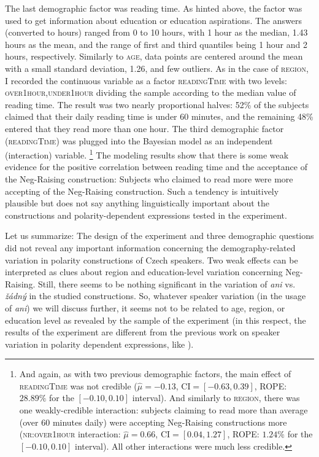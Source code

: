 \documentclass[output=paper,colorlinks,citecolor=brown]{langscibook}
\begin{document}
The last demographic factor was reading time. As hinted above, the factor was used to get information about education or education aspirations. The answers (converted to hours) ranged from 0 to 10 hours, with 1 hour as the median, 1.43 hours as the mean, and the range of first and third quantiles being 1 hour and 2 hours, respectively. Similarly to \textsc{age}, data points are centered around the mean with a small standard deviation, 1.26, and few outliers. As in the case of \textsc{region}, I recorded the continuous variable as a factor \textsc{readingTime} with two levels: \textsc{over1hour,under1hour} dividing the sample according to the median value of reading time. The result was two nearly proportional halves: 52\% of the subjects claimed that their daily reading time is under 60 minutes, and the remaining 48\% entered that they read more than one hour. The third demographic factor (\textsc{readingTime}) was plugged into the Bayesian model as an independent (interaction) variable.%
\footnote{And again, as with two previous demographic factors, the main effect of \textsc{readingTime} was not credible ($\hat{\mu}=-0.13$, $\mathrm{CI}=[-0.63,  0.39]$, ROPE: $28.89\%$ for the $[-0.10, 0.10]$ interval). And similarly to \textsc{region}, there was one weakly-credible interaction: subjects claiming to read more than average (over 60 minutes daily) were accepting Neg-Raising constructions more (\textsc{nr:over1hour} interaction: $\hat{\mu}=0.66$, $\mathrm{CI}=[ 0.04,  1.27]$, ROPE: $1.24\%$ for the $[-0.10, 0.10]$ interval). All other interactions were much less credible.}
The modeling results show that there is some weak evidence for the positive correlation between reading time and the acceptance of the Neg-Raising construction: Subjects who claimed to read more were more accepting of the Neg-Raising construction. Such a tendency is intuitively plausible but does not say anything linguistically important about the constructions and polarity-dependent expressions tested in the experiment.


Let us summarize: The design of the experiment and three demographic questions did not reveal any important information concerning the demography-related variation in polarity constructions of Czech speakers. Two weak effects can be interpreted as clues about region and education-level variation concerning Neg-Raising. Still, there seems to be nothing significant in the variation of \textit{ani} vs. \textit{žádný} in the studied constructions. So, whatever speaker variation (in the usage of \textit{ani}) we will discuss further, it seems not to be related to age, region, or education level as revealed by the sample of the experiment (in this respect, the results of the experiment are different from the previous work on speaker variation in polarity dependent expressions, like \citealt{burnett2015variable,burnett2018structural}). 
\end{document}
